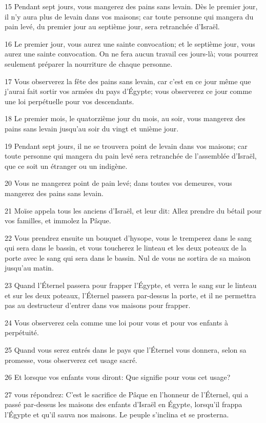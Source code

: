 \par 15 Pendant sept jours, vous mangerez des pains sans levain. Dès le premier jour, il n'y aura plus de levain dans vos maisons; car toute personne qui mangera du pain levé, du premier jour au septième jour, sera retranchée d'Israël.
\par 16 Le premier jour, vous aurez une sainte convocation; et le septième jour, vous aurez une sainte convocation. On ne fera aucun travail ces jours-là; vous pourrez seulement préparer la nourriture de chaque personne.
\par 17 Vous observerez la fête des pains sans levain, car c'est en ce jour même que j'aurai fait sortir vos armées du pays d'Égypte; vous observerez ce jour comme une loi perpétuelle pour vos descendants.
\par 18 Le premier mois, le quatorzième jour du mois, au soir, vous mangerez des pains sans levain jusqu'au soir du vingt et unième jour.
\par 19 Pendant sept jours, il ne se trouvera point de levain dans vos maisons; car toute personne qui mangera du pain levé sera retranchée de l'assemblée d'Israël, que ce soit un étranger ou un indigène.
\par 20 Vous ne mangerez point de pain levé; dans toutes vos demeures, vous mangerez des pains sans levain.
\par 21 Moïse appela tous les anciens d'Israël, et leur dit: Allez prendre du bétail pour vos familles, et immolez la Pâque.
\par 22 Vous prendrez ensuite un bouquet d'hysope, vous le tremperez dans le sang qui sera dans le bassin, et vous toucherez le linteau et les deux poteaux de la porte avec le sang qui sera dans le bassin. Nul de vous ne sortira de sa maison jusqu'au matin.
\par 23 Quand l'Éternel passera pour frapper l'Égypte, et verra le sang sur le linteau et sur les deux poteaux, l'Éternel passera par-dessus la porte, et il ne permettra pas au destructeur d'entrer dans vos maisons pour frapper.
\par 24 Vous observerez cela comme une loi pour vous et pour vos enfants à perpétuité.
\par 25 Quand vous serez entrés dans le pays que l'Éternel vous donnera, selon sa promesse, vous observerez cet usage sacré.
\par 26 Et lorsque vos enfants vous diront: Que signifie pour vous cet usage?
\par 27 vous répondrez: C'est le sacrifice de Pâque en l'honneur de l'Éternel, qui a passé par-dessus les maisons des enfants d'Israël en Égypte, lorsqu'il frappa l'Égypte et qu'il sauva nos maisons. Le peuple s'inclina et se prosterna.
